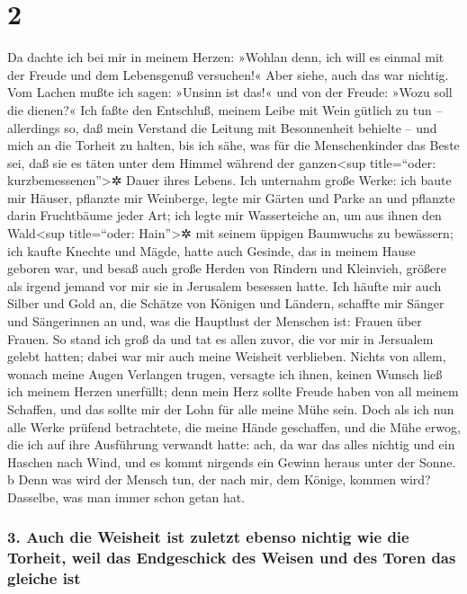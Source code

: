 \hypertarget{section-1}{%
\section{2}\label{section-1}}

Da dachte ich bei mir in meinem Herzen: »Wohlan denn, ich
will es einmal mit der Freude und dem Lebensgenuß versuchen!« Aber
siehe, auch das war nichtig. Vom Lachen mußte ich sagen:
»Unsinn ist das!« und von der Freude: »Wozu soll die dienen?«
Ich faßte den Entschluß, meinem Leibe mit Wein gütlich zu
tun -- allerdings so, daß mein Verstand die Leitung mit Besonnenheit
behielte -- und mich an die Torheit zu halten, bis ich sähe, was für die
Menschenkinder das Beste sei, daß sie es täten unter dem Himmel während
der ganzen\textless sup title=``oder: kurzbemessenen''\textgreater✲
Dauer ihres Lebens. Ich unternahm große Werke: ich baute
mir Häuser, pflanzte mir Weinberge, legte mir Gärten und
Parke an und pflanzte darin Fruchtbäume jeder Art; ich
legte mir Wasserteiche an, um aus ihnen den Wald\textless sup
title=``oder: Hain''\textgreater✲ mit seinem üppigen Baumwuchs zu
bewässern; ich kaufte Knechte und Mägde, hatte auch
Gesinde, das in meinem Hause geboren war, und besaß auch große Herden
von Rindern und Kleinvieh, größere als irgend jemand vor mir sie in
Jerusalem besessen hatte. Ich häufte mir auch Silber und
Gold an, die Schätze von Königen und Ländern, schaffte mir Sänger und
Sängerinnen an und, was die Hauptlust der Menschen ist: Frauen über
Frauen. So stand ich groß da und tat es allen zuvor, die
vor mir in Jersualem gelebt hatten; dabei war mir auch meine Weisheit
verblieben. Nichts von allem, wonach meine Augen
Verlangen trugen, versagte ich ihnen, keinen Wunsch ließ ich meinem
Herzen unerfüllt; denn mein Herz sollte Freude haben von all meinem
Schaffen, und das sollte mir der Lohn für alle meine Mühe sein.
Doch als ich nun alle Werke prüfend betrachtete, die
meine Hände geschaffen, und die Mühe erwog, die ich auf ihre Ausführung
verwandt hatte: ach, da war das alles nichtig und ein Haschen nach Wind,
und es kommt nirgends ein Gewinn heraus unter der Sonne.
b Denn was wird der Mensch tun, der nach mir, dem Könige,
kommen wird? Dasselbe, was man immer schon getan hat.

\hypertarget{auch-die-weisheit-ist-zuletzt-ebenso-nichtig-wie-die-torheit-weil-das-endgeschick-des-weisen-und-des-toren-das-gleiche-ist}{%
\subsubsection{3. Auch die Weisheit ist zuletzt ebenso nichtig wie die
Torheit, weil das Endgeschick des Weisen und des Toren das gleiche
ist}\label{auch-die-weisheit-ist-zuletzt-ebenso-nichtig-wie-die-torheit-weil-das-endgeschick-des-weisen-und-des-toren-das-gleiche-ist}}

